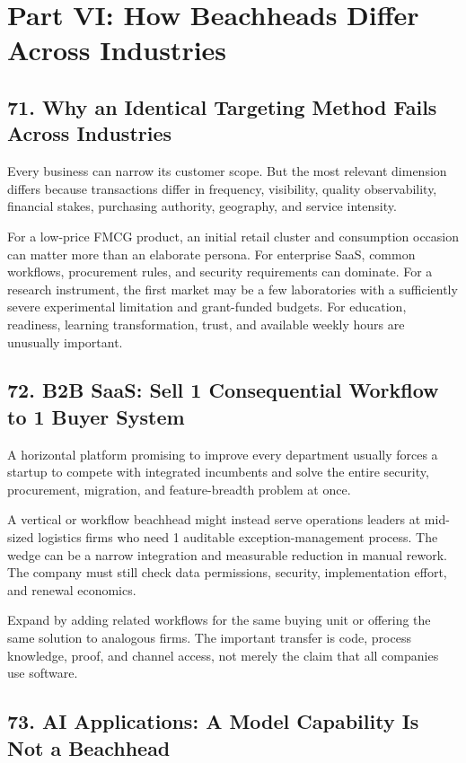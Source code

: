 \section*{Part VI: How Beachheads Differ Across Industries}

\subsection*{71. Why an Identical Targeting Method Fails Across Industries}

Every business can narrow its customer scope. But the most relevant dimension differs because transactions differ in frequency, visibility, quality observability, financial stakes, purchasing authority, geography, and service intensity.

For a low-price FMCG product, an initial retail cluster and consumption occasion can matter more than an elaborate persona. For enterprise SaaS, common workflows, procurement rules, and security requirements can dominate. For a research instrument, the first market may be a few laboratories with a sufficiently severe experimental limitation and grant-funded budgets. For education, readiness, learning transformation, trust, and available weekly hours are unusually important.

\subsection*{72. B2B SaaS: Sell 1 Consequential Workflow to 1 Buyer System}

A horizontal platform promising to improve every department usually forces a startup to compete with integrated incumbents and solve the entire security, procurement, migration, and feature-breadth problem at once.

A vertical or workflow beachhead might instead serve operations leaders at mid-sized logistics firms who need 1 auditable exception-management process. The wedge can be a narrow integration and measurable reduction in manual rework. The company must still check data permissions, security, implementation effort, and renewal economics.

Expand by adding related workflows for the same buying unit or offering the same solution to analogous firms. The important transfer is code, process knowledge, proof, and channel access, not merely the claim that all companies use software.

\subsection*{73. AI Applications: A Model Capability Is Not a Beachhead}

